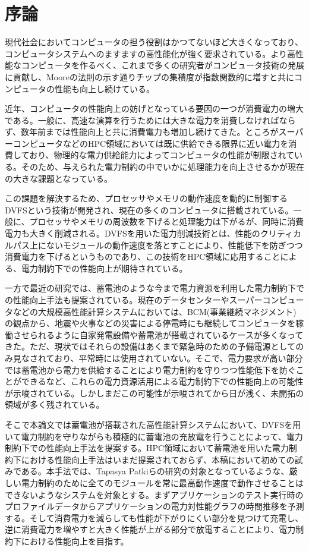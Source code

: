 \chapter{序論}

現代社会においてコンピュータの担う役割はかつてないほど大きくなっており、コンピュータシステムへのますますの高性能化が強く要求されている。より高性能なコンピュータを作るべく、これまで多くの研究者がコンピュータ技術の発展に貢献し、Mooreの法則\cite{mooreslaw}の示す通りチップの集積度が指数関数的に増すと共にコンピュータの性能も向上し続けている。

近年、コンピュータの性能向上の妨げとなっている要因の一つが消費電力の増大である。一般に、高速な演算を行うためには大きな電力を消費しなければならず、数年前までは性能向上と共に消費電力も増加し続けてきた。ところがスーパーコンピュータなどのHPC領域においては既に供給できる限界に近い電力を消費しており、物理的な電力供給能力によってコンピュータの性能が制限されている。そのため、与えられた電力制約の中でいかに処理能力を向上させるかが現在の大きな課題となっている。

この課題を解決するため、プロセッサやメモリの動作速度を動的に制御するDVFSという技術が開発され、現在の多くのコンピュータに搭載されている。一般に、プロセッサやメモリの周波数を下げると処理能力は下がるが、同時に消費電力も大きく削減される。DVFSを用いた電力削減技術とは、性能のクリティカルパス上にないモジュールの動作速度を落とすことにより、性能低下を防ぎつつ消費電力を下げるというものであり、この技術をHPC領域に応用することによる、電力制約下での性能向上が期待されている。

一方で最近の研究では、蓄電池のような今まで電力資源を利用した電力制約下での性能向上手法も提案されている\cite{Govindan:2011:BLT:2024723.2000105}。現在のデータセンターやスーパーコンピュータなどの大規模高性能計算システムにおいては、BCM(事業継続マネジメント)の観点から、地震や火事などの災害による停電時にも継続してコンピュータを稼働させられるように自家発電設備や蓄電池が搭載されているケースが多くなってきた。ただ、現状ではそれらの設備はあくまで緊急時のための予備電源としてのみ見なされており、平常時には使用されていない。そこで、電力要求が高い部分では蓄電池から電力を供給することにより電力制約を守りつつ性能低下を防ぐことができるなど、これらの電力資源活用による電力制約下での性能向上の可能性が示唆されている。しかしまだこの可能性が示唆されてから日が浅く、未開拓の領域が多く残されている。

そこで本論文では蓄電池が搭載された高性能計算システムにおいて、DVFSを用いて電力制約を守りながらも積極的に蓄電池の充放電を行うことによって、電力制約下での性能向上手法を提案する。HPC領域において蓄電池を用いた電力制約下における性能向上手法はいまだ提案されておらず、本稿において初めての試みである。本手法では、Tapasya Patkiらの研究\cite{Patki:2013:EHO:2464996.2465009}の対象となっているような、厳しい電力制約のために全てのモジュールを常に最高動作速度で動作させることはできないようなシステムを対象とする。まずアプリケーションのテスト実行時のプロファイルデータからアプリケーションの電力対性能グラフの時間推移を予測する。そして消費電力を減らしても性能が下がりにくい部分を見つけて充電し、逆に消費電力を増やすと大きく性能が上がる部分で放電することにより、電力制約下における性能向上を目指す。

